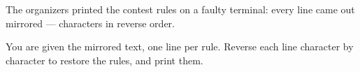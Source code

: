 The organizers printed the contest rules on a faulty terminal: every line came out mirrored --- characters in reverse order.

You are given the mirrored text, one line per rule. Reverse each line character by character to restore the rules, and print them.
